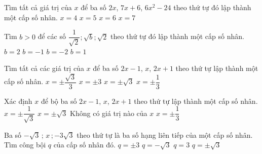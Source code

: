 \begin{ex}%
	Tìm tất cả giá trị của $x$ để ba số $2x$, $7x+6$, $6 x^2-24$ theo thứ tự đó lập  thành một cấp số nhân.
	\choice 
		 {$x=4$}
		{$x=5$} 
		 {\True $x=6$}
		{$x=7$} 
\end{ex}

\begin{ex}%
	Tìm $b>0$ để các số $\dfrac{1}{\sqrt{2}};\sqrt{b};\sqrt{2}$ theo thứ tự đó lập thành một cấp số nhân. 
	 \choice
		 {$b=2$}
		 {$b=-1$}
		 {$b=-2$}
		 {\True $b=1$}
\end{ex}

\begin{ex}%
	Tìm tất cả các  giá trị của $x$ để ba số $2x-1$, $x$, $2x+1$ theo thứ tự lập thành một cấp số nhân.
	\choice 
		{\True $x=\pm  \dfrac{\sqrt{3}}{3}$}
		{$x=\pm 3$} 
		{$x=\pm  \sqrt{3}$}
		{$x=\pm  \dfrac{1}{3}$}
\end{ex}

\begin{ex}%
	Xác định $x$ để bộ ba số $2x-1$, $x$, $2x+1$ theo thứ tự  lập thành một cấp số nhân.
	 \choice
		{ \True $x=\pm \dfrac{1}{\sqrt{3}}$} 
		{$x=\pm  \sqrt{3}$}
		{Không có giá trị nào của  $x$}
		{$x=\pm \dfrac{1}{3}$} 
\end{ex}

\begin{ex}%
	Ba số $-\sqrt{3}\,;\,x\,;-3\sqrt{3}$ theo thứ tự là ba số hạng liên tiếp của một cấp số nhân. Tìm  công bội $q$ của cấp số nhân đó.
	 \choice
		{$q=\pm  3$}
		 {$q=-\sqrt{3}$}
		{$q=3$} 
		 {\True \True $q=\pm \sqrt{3}$}
\end{ex}

